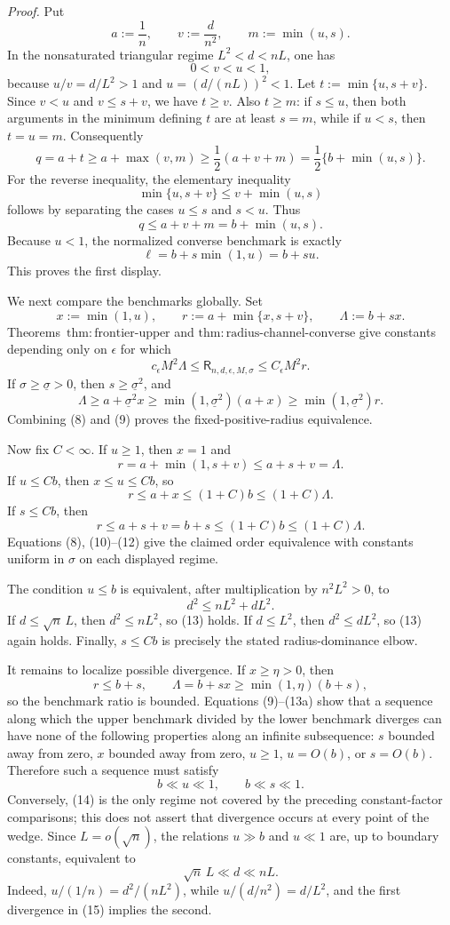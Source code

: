 \textit{Proof.}
Put
\[
a:=\frac1n,\qquad v:=\frac d{n^2},\qquad
m:=\min(u,s).
\tag{1}
\]
In the nonsaturated triangular regime \(L^2<d<nL\), one has
\[
0<v<u<1,
\tag{2}
\]
because \(u/v=d/L^2>1\) and \(u=(d/(nL))^2<1\).  Let \(t:=\min\{u,s+v\}\).  Since \(v<u\) and \(v\le s+v\), we have \(t\ge v\).  Also \(t\ge m\): if \(s\le u\), then both arguments in the minimum defining \(t\) are at least \(s=m\), while if \(u<s\), then \(t=u=m\).  Consequently
\[
q=a+t\ge a+\max(v,m)
\ge\frac12(a+v+m)=\frac12\{b+\min(u,s)\}.
\tag{3}
\]
For the reverse inequality, the elementary inequality
\[
\min\{u,s+v\}\le v+\min(u,s)
\tag{4}
\]
follows by separating the cases \(u\le s\) and \(s<u\).  Thus
\[
q\le a+v+m=b+\min(u,s).
\tag{5}
\]
Because \(u<1\), the normalized converse benchmark is exactly
\[
\ell=b+s\min(1,u)=b+su.
\tag{6}
\]
This proves the first display.

We next compare the benchmarks globally.  Set
\[
x:=\min(1,u),\qquad
r:=a+\min\{x,s+v\},\qquad
\Lambda:=b+sx.
\tag{7}
\]
Theorems~\(\mathrm{thm:frontier\text{-}upper}\) and \(\mathrm{thm:radius\text{-}channel\text{-}converse}\) give constants depending only on \(\epsilon\) for which
\[
c_\epsilon M^2\Lambda
\le\mathsf R_{n,d,\epsilon,M,\sigma}
\le C_\epsilon M^2r.
\tag{8}
\]
If \(\sigma\ge\underline\sigma>0\), then \(s\ge\underline\sigma^2\), and
\[
\Lambda\ge a+\underline\sigma^2x
\ge\min(1,\underline\sigma^2)(a+x)
\ge\min(1,\underline\sigma^2)r.
\tag{9}
\]
Combining (8) and (9) proves the fixed-positive-radius equivalence.

Now fix \(C<\infty\).  If \(u\ge1\), then \(x=1\) and
\[
r=a+\min(1,s+v)\le a+s+v=\Lambda.
\tag{10}
\]
If \(u\le Cb\), then \(x\le u\le Cb\), so
\[
r\le a+x\le(1+C)b\le(1+C)\Lambda.
\tag{11}
\]
If \(s\le Cb\), then
\[
r\le a+s+v=b+s\le(1+C)b\le(1+C)\Lambda.
\tag{12}
\]
Equations (8), (10)--(12) give the claimed order equivalence with constants uniform in \(\sigma\) on each displayed regime.

The condition \(u\le b\) is equivalent, after multiplication by \(n^2L^2>0\), to
\[
d^2\le nL^2+dL^2.
\tag{13}
\]
If \(d\le\sqrt n\,L\), then \(d^2\le nL^2\), so (13) holds.  If \(d\le L^2\), then \(d^2\le dL^2\), so (13) again holds.  Finally, \(s\le Cb\) is precisely the stated radius-dominance elbow.

It remains to localize possible divergence.  If \(x\ge\eta>0\), then
\[
r\le b+s,
\qquad
\Lambda=b+sx\ge\min(1,\eta)(b+s),
\tag{13a}
\]
so the benchmark ratio is bounded.  Equations (9)--(13a) show that a sequence along which the upper benchmark divided by the lower benchmark diverges can have none of the following properties along an infinite subsequence: \(s\) bounded away from zero, \(x\) bounded away from zero, \(u\ge1\), \(u=O(b)\), or \(s=O(b)\).  Therefore such a sequence must satisfy
\[
b\ll u\ll1,
\qquad b\ll s\ll1.
\tag{14}
\]
Conversely, (14) is the only regime not covered by the preceding constant-factor comparisons; this does not assert that divergence occurs at every point of the wedge.  Since \(L=o(\sqrt n)\), the relations \(u\gg b\) and \(u\ll1\) are, up to boundary constants, equivalent to
\[
\sqrt n\,L\ll d\ll nL.
\tag{15}
\]
Indeed, \(u/(1/n)=d^2/(nL^2)\), while \(u/(d/n^2)=d/L^2\), and the first divergence in (15) implies the second.

